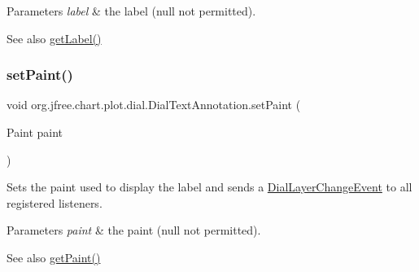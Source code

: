 \begin{DoxyParams}{Parameters}
{\em label} & the label ({\ttfamily null} not permitted).\\
\hline
\end{DoxyParams}
\begin{DoxySeeAlso}{See also}
\mbox{\hyperlink{classorg_1_1jfree_1_1chart_1_1plot_1_1dial_1_1_dial_text_annotation_a4a323befb5330a7235ab440acb7ed7f3}{get\+Label()}} 
\end{DoxySeeAlso}
\mbox{\label{classorg_1_1jfree_1_1chart_1_1plot_1_1dial_1_1_dial_text_annotation_a2387e078af17fa2b1882aea73b804e03}} 
\subsubsection{\texorpdfstring{set\+Paint()}{setPaint()}}
{\footnotesize\ttfamily void org.\+jfree.\+chart.\+plot.\+dial.\+Dial\+Text\+Annotation.\+set\+Paint (\begin{DoxyParamCaption}\item[{Paint}]{paint }\end{DoxyParamCaption})}

Sets the paint used to display the label and sends a \mbox{\hyperlink{classorg_1_1jfree_1_1chart_1_1plot_1_1dial_1_1_dial_layer_change_event}{Dial\+Layer\+Change\+Event}} to all registered listeners.


\begin{DoxyParams}{Parameters}
{\em paint} & the paint ({\ttfamily null} not permitted).\\
\hline
\end{DoxyParams}
\begin{DoxySeeAlso}{See also}
\mbox{\hyperlink{classorg_1_1jfree_1_1chart_1_1plot_1_1dial_1_1_dial_text_annotation_ac86f835c243012c82ef02228b910064d}{get\+Paint()}} 
\end{DoxySeeAlso}
\mbox{\label{classorg_1_1jfree_1_1chart_1_1plot_1_1dial_1_1_dial_text_annotation_a965ee047f464d6e4d7b8ec01f18bf913}} 
